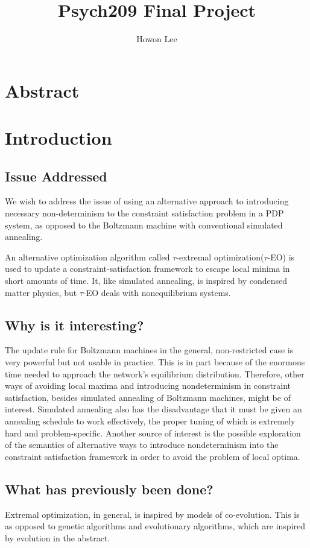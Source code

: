 \documentclass[12pt]{article}
\begin{document}
\title{Psych209 Final Project}
\author{Howon Lee}
\maketitle
\section*{Abstract}
\section*{Introduction}
\subsection*{Issue Addressed}

We wish to address the issue of using an alternative approach to introducing necessary non-determinism to the constraint satisfaction problem in a PDP system, as opposed to the Boltzmann machine with conventional simulated annealing.

An alternative optimization algorithm called $\tau$-extremal optimization($\tau$-EO) is used to update a constraint-satisfaction framework to escape local minima in short amounts of time. It, like simulated annealing, is inspired by condensed matter physics, but $\tau$-EO deals with nonequilibrium systems.

\subsection*{Why is it interesting?}

The update rule for Boltzmann machines in the general, non-restricted case is very powerful but not usable in practice. This is in part because of the enormous time needed to approach the network's equilibrium distribution. Therefore, other ways of avoiding local maxima and introducing nondeterminism in constraint satisfaction, besides simulated annealing of Boltzmann machines, might be of interest. Simulated annealing also has the disadvantage that it must be given an annealing schedule to work effectively, the proper tuning of which is extremely hard and problem-specific. Another source of interest is the possible exploration of the semantics of alternative ways to introduce nondeterminism into the constraint satisfaction framework in order to avoid the problem of local optima.

\subsection*{What has previously been done?}
Extremal optimization, in general, is inspired by models of co-evolution. This is as opposed to genetic algorithms and evolutionary algorithms, which are inspired by evolution in the abstract.
\end{document}

